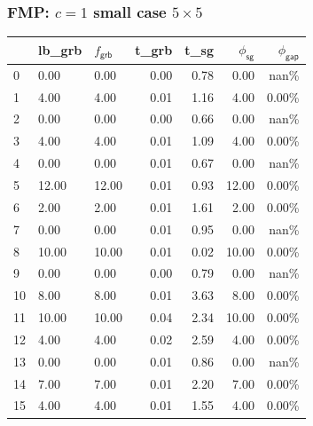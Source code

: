 \begin{frame}
  \frametitle{FMP: \(c=1\) small case \(5\times 5\)}
  \scriptsize
  \begin{tabular}{lllrrrr}
    \toprule
    {} & lb\_grb & \(f_{\textsf{grb}}\)   & t\_grb
       & t\_sg   & \(\phi_{\textsf{sg}}\) & \(\phi_{\textsf{gap}}\)                          \\
    \midrule
    0  & 0.00    & 0.00                   & 0.00                    & 0.78 & 0.00  & nan\%   \\
    1  & 4.00    & 4.00                   & 0.01                    & 1.16 & 4.00  & 0.00\%  \\
    2  & 0.00    & 0.00                   & 0.00                    & 0.66 & 0.00  & nan\%   \\
    3  & 4.00    & 4.00                   & 0.01                    & 1.09 & 4.00  & 0.00\%  \\
    4  & 0.00    & 0.00                   & 0.01                    & 0.67 & 0.00  & nan\%   \\
    5  & 12.00   & 12.00                  & 0.01                    & 0.93 & 12.00 & 0.00\%  \\
    6  & 2.00    & 2.00                   & 0.01                    & 1.61 & 2.00  & 0.00\%  \\
    7  & 0.00    & 0.00                   & 0.01                    & 0.95 & 0.00  & nan\%   \\
    8  & 10.00   & 10.00                  & 0.01                    & 0.02 & 10.00 & 0.00\%  \\
    9  & 0.00    & 0.00                   & 0.00                    & 0.79 & 0.00  & nan\%   \\
    10 & 8.00    & 8.00                   & 0.01                    & 3.63 & 8.00  & 0.00\%  \\
    11 & 10.00   & 10.00                  & 0.04                    & 2.34 & 10.00 & 0.00\%  \\
    12 & 4.00    & 4.00                   & 0.02                    & 2.59 & 4.00  & 0.00\%  \\
    13 & 0.00    & 0.00                   & 0.01                    & 0.86 & 0.00  & nan\%   \\
    14 & 7.00    & 7.00                   & 0.01                    & 2.20 & 7.00  & 0.00\%  \\
    15 & 4.00    & 4.00                   & 0.01                    & 1.55 & 4.00  & 0.00\%  \\

\end{tabular}
\end{frame}
